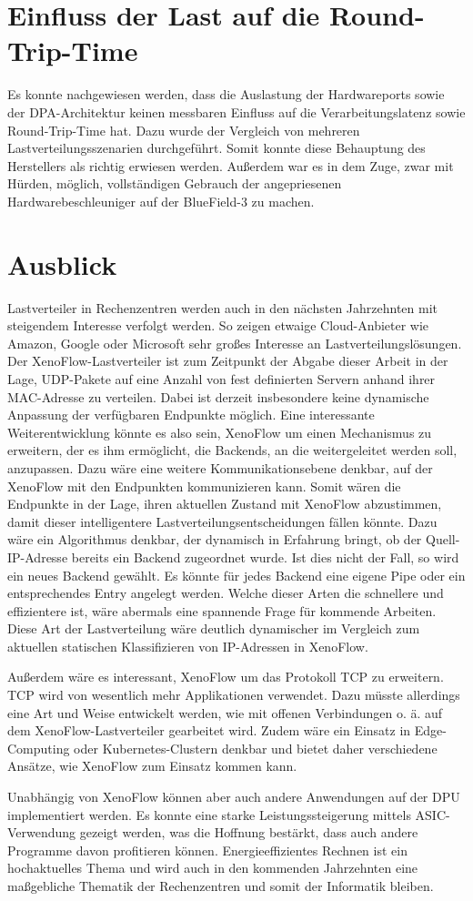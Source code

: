 \section{Einfluss der Last auf die Round-Trip-Time}
Es konnte nachgewiesen werden, dass die Auslastung der Hardwareports sowie der DPA-Architektur keinen messbaren Einfluss auf die Verarbeitungslatenz sowie Round-Trip-Time hat. Dazu wurde der Vergleich von mehreren Lastverteilungsszenarien durchgeführt. Somit konnte diese Behauptung des Herstellers als richtig erwiesen werden. Außerdem war es in dem Zuge, zwar mit Hürden, möglich, vollständigen Gebrauch der angepriesenen Hardwarebeschleuniger auf der BlueField-3 zu machen.  
\section{Ausblick}
Lastverteiler in Rechenzentren werden auch in den nächsten Jahrzehnten mit steigendem Interesse verfolgt werden. So zeigen etwaige Cloud-Anbieter wie Amazon, Google oder Microsoft sehr großes Interesse an Lastverteilungslösungen.
Der XenoFlow-Lastverteiler ist zum Zeitpunkt der Abgabe dieser Arbeit in der Lage, UDP-Pakete auf eine Anzahl von fest definierten Servern anhand ihrer MAC-Adresse zu verteilen. Dabei ist derzeit insbesondere keine dynamische Anpassung der verfügbaren Endpunkte möglich. Eine interessante Weiterentwicklung könnte es also sein, XenoFlow um einen Mechanismus zu erweitern, der es ihm ermöglicht, die Backends, an die weitergeleitet werden soll, anzupassen. Dazu wäre eine weitere Kommunikationsebene denkbar, auf der XenoFlow mit den Endpunkten kommunizieren kann. Somit wären die Endpunkte in der Lage, ihren aktuellen Zustand mit XenoFlow abzustimmen, damit dieser intelligentere Lastverteilungsentscheidungen fällen könnte. Dazu wäre ein Algorithmus denkbar, der dynamisch in Erfahrung bringt, ob der Quell-IP-Adresse bereits ein Backend zugeordnet wurde. Ist dies nicht der Fall, so wird ein neues Backend gewählt. Es könnte für jedes Backend eine eigene Pipe oder ein entsprechendes Entry angelegt werden. Welche dieser Arten die schnellere und effizientere ist, wäre abermals eine spannende Frage für kommende Arbeiten. Diese Art der Lastverteilung wäre deutlich dynamischer im Vergleich zum aktuellen statischen Klassifizieren von IP-Adressen in XenoFlow.

Außerdem wäre es interessant, XenoFlow um das Protokoll TCP zu erweitern. TCP wird von wesentlich mehr Applikationen verwendet. Dazu müsste allerdings eine Art und Weise entwickelt werden, wie mit offenen Verbindungen o. ä. auf dem XenoFlow-Lastverteiler gearbeitet wird. Zudem wäre ein Einsatz in Edge-Computing oder Kubernetes-Clustern denkbar und bietet daher verschiedene Ansätze, wie XenoFlow zum Einsatz kommen kann.

Unabhängig von XenoFlow können aber auch andere Anwendungen auf der DPU implementiert werden. Es konnte eine starke Leistungssteigerung mittels ASIC-Verwendung gezeigt werden, was die Hoffnung bestärkt, dass auch andere Programme davon profitieren können. Energieeffizientes Rechnen ist ein hochaktuelles Thema und wird auch in den kommenden Jahrzehnten eine maßgebliche Thematik der Rechenzentren und somit der Informatik bleiben.